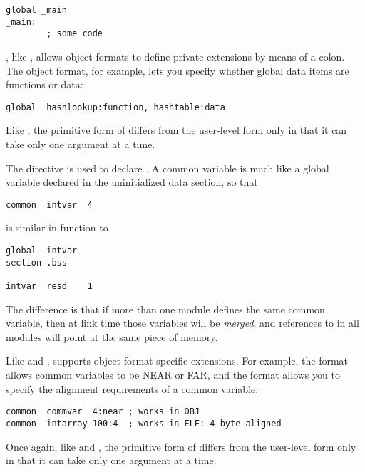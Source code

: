 \begin{lstlisting}
global _main
_main:
        ; some code
\end{lstlisting}

, like , allows object formats to define private
extensions by means of a colon. The  object format, for
example, lets you specify whether global data items are functions or
data:

\begin{lstlisting}
global  hashlookup:function, hashtable:data
\end{lstlisting}

Like , the primitive form of  differs
from the user-level form only in that it can take only one argument
at a time.


The  directive is used to declare . A common variable is much like a global variable declared
in the uninitialized data section, so that

\begin{lstlisting}
common  intvar  4
\end{lstlisting}

is similar in function to

\begin{lstlisting}
global  intvar
section .bss

intvar  resd    1
\end{lstlisting}

The difference is that if more than one module defines the same
common variable, then at link time those variables will be
\emph{merged}, and references to  in all modules
will point at the same piece of memory.

Like  and ,  supports
object-format specific extensions. For example, the 
format allows common variables to be NEAR or FAR, and the 
format allows you to specify the alignment requirements of
a common variable:

\begin{lstlisting}
common  commvar  4:near ; works in OBJ
common  intarray 100:4  ; works in ELF: 4 byte aligned
\end{lstlisting}

Once again, like  and , the primitive form of
 differs from the user-level form only in that it can take
only one argument at a time.

